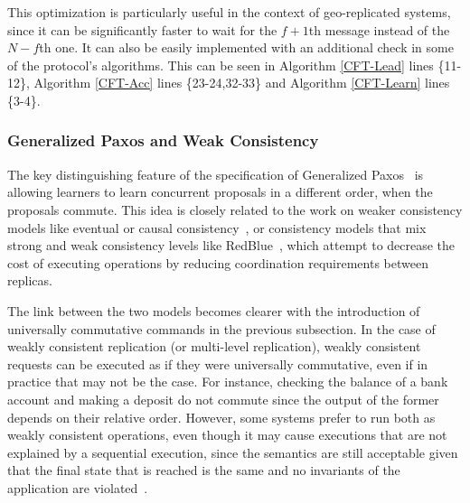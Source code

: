 This optimization is particularly useful in the context of geo-replicated systems, since it can be significantly faster to wait for the $f+1$th message instead of the $N-f$th one. It can also be easily implemented with an additional check in some of the protocol's algorithms. This can be seen in Algorithm \ref{CFT-Lead} lines \{11-12\}, Algorithm \ref{CFT-Acc} lines \{23-24,32-33\} and Algorithm \ref{CFT-Learn} lines \{3-4\}.

\subsubsection{Generalized Paxos and Weak Consistency}
The key distinguishing feature of the specification of Generalized Paxos~\cite{Lamport2005} is allowing learners to learn concurrent proposals in a different order, when the proposals commute. This idea is closely related to the work on weaker consistency models like eventual or causal consistency~\cite{Ahamad1995}, or consistency models that mix
strong and weak consistency levels like RedBlue~\cite{Li2012}, which attempt to decrease the cost of executing operations by reducing coordination requirements between replicas. 

The link between the two models becomes clearer with the introduction of universally commutative commands in the previous subsection. In the case of weakly consistent replication (or multi-level replication), weakly consistent requests can be executed as if they were universally commutative, even if in practice that may not be the case. For instance, checking the balance of a bank account and making a deposit do not commute since the output of the former depends on their relative order. However, some systems prefer to run both as weakly consistent operations, even though it may cause executions that are not explained by a sequential execution, since the semantics are still acceptable given that the final state that is reached is the same and no invariants of the application are violated~\cite{Li2012}.
